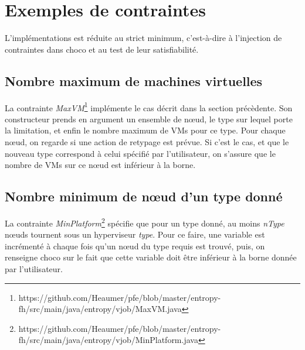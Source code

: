 \documentclass[a4paper]{article}
\begin{document}
\section{Exemples de contraintes}
L'implémentations est réduite au strict minimum, c'est-à-dire à l'injection
de contraintes dans choco et au test de leur satisfiabilité.
\subsection{Nombre maximum de machines virtuelles}
La contrainte \textit{MaxVM}\footnote{https://github.com/Heaumer/pfe/blob/master/entropy-fh/src/main/java/entropy/vjob/MaxVM.java}
implémente le cas décrit dans la section précèdente. Son constructeur prends
en argument un ensemble de nœud, le type sur lequel porte la limitation, et
enfin le nombre maximum de VMs pour ce type. Pour chaque nœud, on regarde
si une action de retypage est prévue. Si c'est le cas, et que le nouveau
type correspond à celui spécifié par l'utilisateur, on s'assure que le nombre
de VMs sur ce nœud est inférieur à la borne.

\subsection{Nombre minimum de nœud d'un type donné}
La contrainte \textit{MinPlatform}\footnote{https://github.com/Heaumer/pfe/blob/master/entropy-fh/src/main/java/entropy/vjob/MinPlatform.java}
spécifie que pour un type donné, au moins \textit{nType} nœuds tournent sous
un hyperviseur \textit{type}. Pour ce faire, une variable est incrémenté à
chaque fois qu'un nœud du type requis est trouvé, puis, on renseigne choco
sur le fait que cette variable doit être inférieur à la borne donnée par
l'utilisateur.
\end{document}
